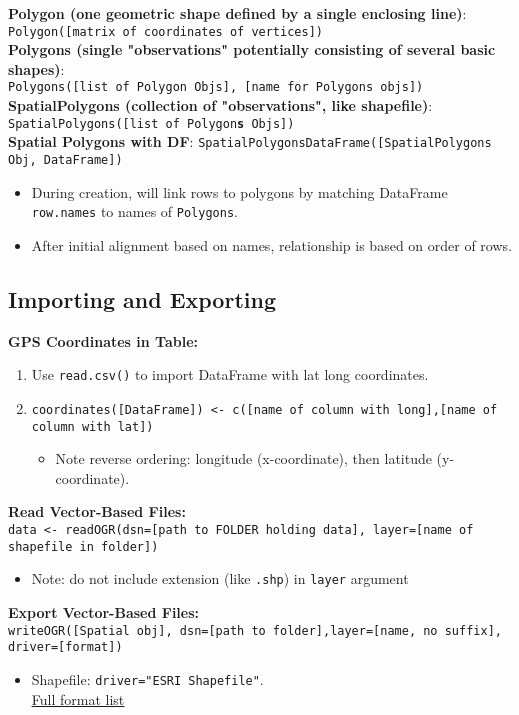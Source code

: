 \documentclass[10pt]{article}
\begin{document}
\textbf{Polygon (one geometric shape defined by a single enclosing line)}: \\
\hspace*{1cm}\texttt{Polygon([matrix of coordinates of vertices])} \\
\textbf{Polygons (single "observations" potentially consisting of several basic shapes)}:\\ 
\hspace*{1cm} \texttt{Polygons([list of Polygon Objs], [name for Polygons objs])}\\
\textbf{SpatialPolygons (collection of "observations", like shapefile)}:\\
\hspace*{1cm} \texttt{SpatialPolygons([list of Polygon\textbf{s} Objs])}\\
\textbf{Spatial Polygons with DF}: \texttt{SpatialPolygonsDataFrame([SpatialPolygons Obj, DataFrame])}
\begin{itemize}
	\item During creation, will link rows to polygons by matching DataFrame \texttt{row.names} to names of \texttt{Polygons}.
	\item After initial alignment based on names, relationship is based on order of rows. 
\end{itemize}


\hrulefill 
\subsection*{Importing and Exporting}
\textbf{GPS Coordinates in Table:}
\begin{enumerate}
	\item Use \texttt{read.csv()} to import DataFrame with lat long coordinates.
	\item \texttt{coordinates([DataFrame]) <- c([name of column with long],[name of column with lat])}
	\begin{itemize}
		\item Note reverse ordering: longitude (x-coordinate), then latitude (y-coordinate).
	\end{itemize}
\end{enumerate}
\textbf{Read Vector-Based Files:}\\
\texttt{data <- readOGR(dsn=[path to FOLDER holding data], layer=[name of shapefile in folder])}
\begin{itemize}
	\item Note: do not include extension (like \texttt{.shp}) in \texttt{layer} argument
\end{itemize}
\textbf{Export Vector-Based Files:}\\
\texttt{writeOGR([Spatial obj], dsn=[path to folder],layer=[name, no suffix], driver=[format])}
\begin{itemize}
	\item Shapefile: \texttt{driver="ESRI Shapefile"}.\\ \href{http://www.gdal.org/ogr_formats.html}{\underline{Full format list}}
\end{itemize}
\end{document}
